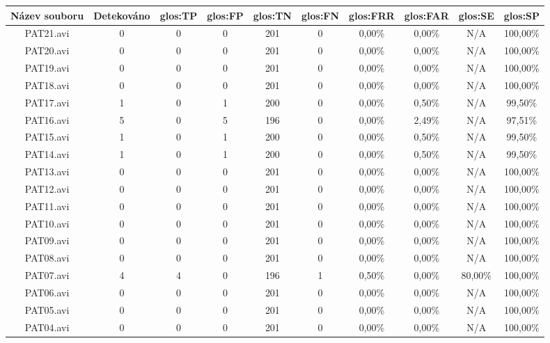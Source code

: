 \begin{table}[h]
	\begin{adjustwidth}{-.5in}{-.5in} 
	\centering
	\begin{tabular}{|c|c|c|c|c|c|c|c|c|c|}
		\hline
		\bf Název souboru & \bf Detekováno & \bf \gls{glos:TP} & \bf \gls{glos:FP} & \bf \gls{glos:TN} & \bf \gls{glos:FN} & \bf \gls{glos:FRR} & \bf \gls{glos:FAR} & \bf \gls{glos:SE} & \bf \gls{glos:SP} \\ \hline
		PAT21.avi & 0 & 0 & 0 & 201 & 0 & 0,00\% & 0,00\% & N/A & 100,00\% \\ \hline
		PAT20.avi & 0 & 0 & 0 & 201 & 0 & 0,00\% & 0,00\% & N/A & 100,00\% \\ \hline
		PAT19.avi & 0 & 0 & 0 & 201 & 0 & 0,00\% & 0,00\% & N/A & 100,00\% \\ \hline
		PAT18.avi & 0 & 0 & 0 & 201 & 0 & 0,00\% & 0,00\% & N/A & 100,00\% \\ \hline
		PAT17.avi & 1 & 0 & 1 & 200 & 0 & 0,00\% & 0,50\% & N/A & 99,50\% \\ \hline
		PAT16.avi & 5 & 0 & 5 & 196 & 0 & 0,00\% & 2,49\% & N/A & 97,51\% \\ \hline
		PAT15.avi & 1 & 0 & 1 & 200 & 0 & 0,00\% & 0,50\% & N/A & 99,50\% \\ \hline
		PAT14.avi & 1 & 0 & 1 & 200 & 0 & 0,00\% & 0,50\% & N/A & 99,50\% \\ \hline
		PAT13.avi & 0 & 0 & 0 & 201 & 0 & 0,00\% & 0,00\% & N/A & 100,00\% \\ \hline
		PAT12.avi & 0 & 0 & 0 & 201 & 0 & 0,00\% & 0,00\% & N/A & 100,00\% \\ \hline
		PAT11.avi & 0 & 0 & 0 & 201 & 0 & 0,00\% & 0,00\% & N/A & 100,00\% \\ \hline
		PAT10.avi & 0 & 0 & 0 & 201 & 0 & 0,00\% & 0,00\% & N/A & 100,00\% \\ \hline
		PAT09.avi & 0 & 0 & 0 & 201 & 0 & 0,00\% & 0,00\% & N/A & 100,00\% \\ \hline
		PAT08.avi & 0 & 0 & 0 & 201 & 0 & 0,00\% & 0,00\% & N/A & 100,00\% \\ \hline
		PAT07.avi & 4 & 4 & 0 & 196 & 1 & 0,50\% & 0,00\% & 80,00\% & 100,00\% \\ \hline
		PAT06.avi & 0 & 0 & 0 & 201 & 0 & 0,00\% & 0,00\% & N/A & 100,00\% \\ \hline
		PAT05.avi & 0 & 0 & 0 & 201 & 0 & 0,00\% & 0,00\% & N/A & 100,00\% \\ \hline
		PAT04.avi & 0 & 0 & 0 & 201 & 0 & 0,00\% & 0,00\% & N/A & 100,00\% \\ \hline

\end{tabular}
\end{adjustwidth}
\end{table}
